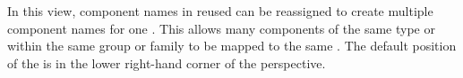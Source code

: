 \item[\gdcompnamesview]{In this view, component names in reused \gdcases{} can 
be reassigned to create multiple component names for one \gdstep{}. This
allows many components of the same  type or within the same group 
or family  to be mapped to the same 
\gdstep{}. The default position of the \gdcompnamesview{} is in the 
lower right-hand corner of the perspective.
}
